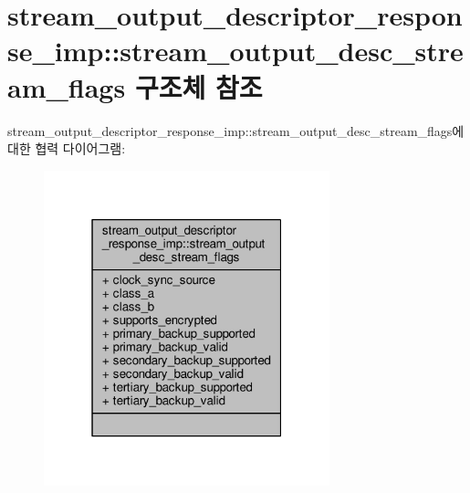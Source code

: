 \hypertarget{structavdecc__lib_1_1stream__output__descriptor__response__imp_1_1stream__output__desc__stream__flags}{}\section{stream\+\_\+output\+\_\+descriptor\+\_\+response\+\_\+imp\+:\+:stream\+\_\+output\+\_\+desc\+\_\+stream\+\_\+flags 구조체 참조}
\label{structavdecc__lib_1_1stream__output__descriptor__response__imp_1_1stream__output__desc__stream__flags}


stream\+\_\+output\+\_\+descriptor\+\_\+response\+\_\+imp\+:\+:stream\+\_\+output\+\_\+desc\+\_\+stream\+\_\+flags에 대한 협력 다이어그램\+:
\nopagebreak
\begin{figure}[H]
\begin{center}
\leavevmode
\includegraphics[width=235pt]{structavdecc__lib_1_1stream__output__descriptor__response__imp_1_1stream__output__desc__stream__flags__coll__graph}
\end{center}
\end{figure}
